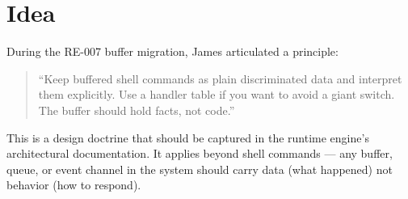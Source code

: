 \section{Idea}\label{record-400-idea}

During the RE-007 buffer migration, James articulated a principle:

\begin{quote}
``Keep buffered shell commands as plain discriminated data and interpret them explicitly. Use a handler table if you want to avoid a giant switch. The buffer should hold facts, not code.''
\end{quote}

This is a design doctrine that should be captured in the runtime engine's architectural documentation. It applies beyond shell commands --- any buffer, queue, or event channel in the system should carry data (what happened) not behavior (how to respond).

